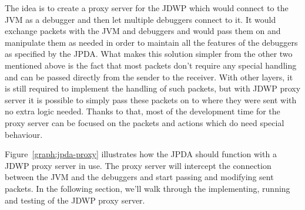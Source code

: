 \documentclass[..thesis.tex]{subfiles}
\begin{document}
The idea is to create a proxy server for the JDWP which would connect to the JVM as a debugger and then let multiple debuggers connect to it.
It would exchange packets with the JVM and debuggers and would pass them on and manipulate them as needed in order to maintain all the features of the debuggers as specified by the JPDA.
What makes this solution simpler from the other two mentioned above is the fact that most packets don't require any special handling and can be passed directly from the sender to the receiver.
With other layers, it is still required to implement the handling of such packets, but with JDWP proxy server it is possible to simply pass these packets on to where they were sent with no extra logic needed.
Thanks to that, most of the development time for the proxy server can be focused on the packets and actions which do need special behaviour.



Figure~\ref{graph:jpda-proxy} illustrates how the JPDA should function with a JDWP proxy server in use.
The proxy server will intercept the connection between the JVM and the debuggers and start passing and modifying sent packets.
In the following section, we'll walk through the implementing, running and testing of the JDWP proxy server.
\end{document}
